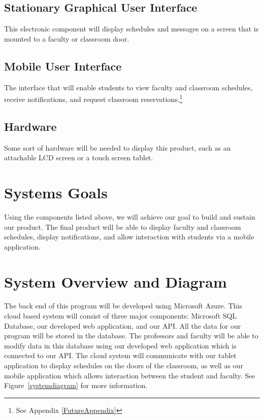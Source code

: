 \subsection{Stationary Graphical User Interface}
This electronic component will display schedules and messages on a screen that is mounted to a faculty or classroom door. 

\subsection{Mobile User Interface}
The interface that will enable students to view faculty and classroom schedules, receive notifications, and request classroom reservations.\footnote{See Appendix \ref{FutureAppendix}}

\subsection{Hardware}
Some sort of hardware will be needed to display this product, such as an attachable LCD screen or a touch screen tablet.  

\section{Systems Goals}
Using the components listed above, we will achieve our goal to build and sustain our product. The final product will be able to display faculty and classroom schedules, display notifications, and allow interaction with students via a mobile application.

\section{System Overview and Diagram}
The back end of this program will be developed using Microsoft Azure. This cloud based system will consist of three major components: Microsoft SQL Database, our developed web application, and our API.  All the data for our program will be stored in the database.  The professors and faculty will be able to modify data in this database using our developed web application which is connected to our API.  The cloud system will communicate with our tablet application to display schedules on the doors of the classroom, as well as our mobile application which allows interaction between the student and faculty. See Figure~\ref{systemdiagram} for more information.

